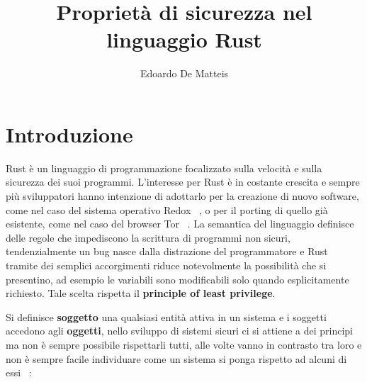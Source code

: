 \documentclass[Lau,binding=0.6cm]{sapthesis}
\title{Proprietà di sicurezza nel linguaggio Rust}
\author{Edoardo De Matteis}
\begin{document}
\frontmatter

\maketitle




\tableofcontents


\mainmatter

\chapter{Introduzione}
Rust è un linguaggio di programmazione focalizzato sulla velocità e sulla sicurezza dei suoi programmi.
L'interesse per Rust è in costante crescita e sempre più sviluppatori hanno intenzione di adottarlo per la creazione di nuovo software, come nel caso del sistema operativo Redox ~\cite{redox}, o per il porting di quello già esistente, come nel caso del browser Tor ~\cite{tor}.
La semantica del linguaggio definisce delle regole che impediscono la scrittura di programmi non sicuri, tendenzialmente un bug nasce dalla distrazione del programmatore e Rust tramite dei semplici accorgimenti riduce notevolmente la possibilità che si presentino, ad esempio le variabili sono modificabili solo quando esplicitamente richiesto.
Tale scelta rispetta il \textbf{principle of least privilege}.


Si definisce \textbf{soggetto} una qualsiasi entità attiva in un sistema e i soggetti accedono agli \textbf{oggetti}, nello sviluppo di sistemi sicuri ci si attiene a dei principi ma non è sempre possibile rispettarli tutti, alle volte vanno in contrasto tra loro e non è sempre facile individuare come un sistema si ponga rispetto ad alcuni di essi ~\cite{gollmann:computersecurity}:
\end{document}
